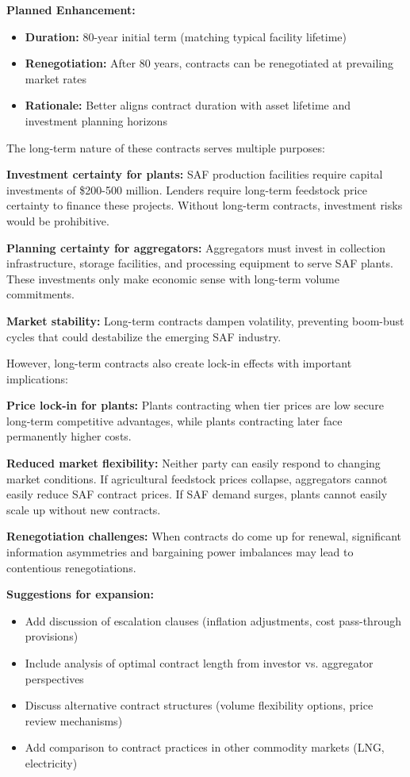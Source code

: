 \documentclass[10.5pt]{article}
\begin{document}
\textbf{Planned Enhancement:}
\begin{itemize}
    \item \textbf{Duration:} 80-year initial term (matching typical facility lifetime)
    \item \textbf{Renegotiation:} After 80 years, contracts can be renegotiated at prevailing market rates
    \item \textbf{Rationale:} Better aligns contract duration with asset lifetime and investment planning horizons
\end{itemize}

The long-term nature of these contracts serves multiple purposes:

\textbf{Investment certainty for plants:} SAF production facilities require capital investments of \$200-500 million. Lenders require long-term feedstock price certainty to finance these projects. Without long-term contracts, investment risks would be prohibitive.

\textbf{Planning certainty for aggregators:} Aggregators must invest in collection infrastructure, storage facilities, and processing equipment to serve SAF plants. These investments only make economic sense with long-term volume commitments.

\textbf{Market stability:} Long-term contracts dampen volatility, preventing boom-bust cycles that could destabilize the emerging SAF industry.

However, long-term contracts also create lock-in effects with important implications:

\textbf{Price lock-in for plants:} Plants contracting when tier prices are low secure long-term competitive advantages, while plants contracting later face permanently higher costs.

\textbf{Reduced market flexibility:} Neither party can easily respond to changing market conditions. If agricultural feedstock prices collapse, aggregators cannot easily reduce SAF contract prices. If SAF demand surges, plants cannot easily scale up without new contracts.

\textbf{Renegotiation challenges:} When contracts do come up for renewal, significant information asymmetries and bargaining power imbalances may lead to contentious renegotiations.

\textbf{Suggestions for expansion:}
\begin{itemize}
    \item Add discussion of escalation clauses (inflation adjustments, cost pass-through provisions)
    \item Include analysis of optimal contract length from investor vs. aggregator perspectives
    \item Discuss alternative contract structures (volume flexibility options, price review mechanisms)
    \item Add comparison to contract practices in other commodity markets (LNG, electricity)
\end{itemize}
\end{document}
